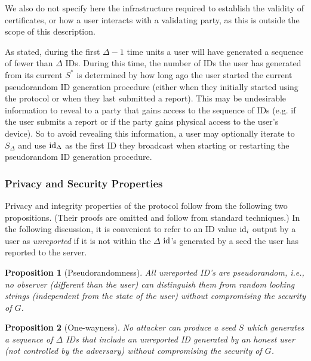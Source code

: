 \documentclass{article}
\newtheorem{proposition}{Proposition}
\begin{document}
We also do not specify here the infrastructure required to establish the validity of certificates, or how a user interacts with a validating party, as this is outside the scope of this description. 

As stated, during the first $\Delta-1$ time units a user will have generated a sequence of fewer than $\Delta$ IDs.
During this time, the number of IDs the user has generated from its current $S^\ast$ is determined by how long ago the user started the current pseudorandom ID generation procedure (either when they initially started using the protocol or when they last submitted a report).   
This may be undesirable information to reveal to a party that gains access to the sequence of IDs (e.g. if the user submits a report or if the party gains physical access to the user's device). 
So to avoid revealing this information, a user may optionally iterate to $S_{\Delta}$ and use $\mathrm{id}_{\Delta}$ as the first ID they broadcast when starting or restarting the pseudorandom ID generation procedure.


\subsubsection{Privacy and Security Properties}

Privacy and integrity properties of the protocol follow from the following two propositions. (Their proofs are omitted and follow from standard techniques.) In the following discussion, it is convenient to refer to an ID value $\mathrm{id}_i$ output by a user as {\em unreported} if it is not within the $\Delta$ $\mathrm{id}$'s generated by a seed the user has reported to the server. 

\begin{proposition}[Pseudorandomness]
   All unreported ID's are pseudorandom, i.e., no observer (different than the user) can distinguish them from random looking strings (independent from the state of the user) without compromising the security of $G$.
\end{proposition}

\begin{proposition}[One-wayness]
   No attacker can produce a seed $S$ which generates a sequence of $\Delta$ IDs that include an unreported ID generated by an honest user (not controlled by the adversary) without compromising the security of $G$.
\end{proposition}
\end{document}
